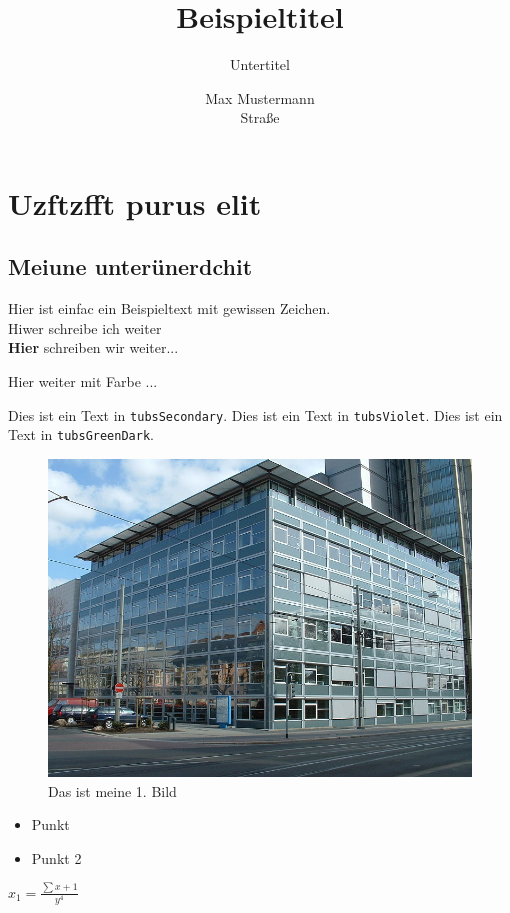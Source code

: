 \documentclass[%
  a4paper,%
  12pt,%
  blue,%
  ]{tubsartcl}
\title{Beispieltitel}
\subtitle{Untertitel}
\author{Max Mustermann\\\large{Straße}}
\begin{document}
\maketitle%

\tableofcontents
\newpage

\section{Uzftzfft purus elit}
\subsection{Meiune unterünerdchit}
Hier ist einfac ein Beispieltext mit gewissen Zeichen.\\
Hiwer schreibe ich weiter\\
\textbf{Hier} schreiben wir weiter...

\textcolor{tubsViolet}{Hier weiter mit Farbe ...}

\textcolor{tubsSecondaryLight80}{Dies ist ein Text in \texttt{tubsSecondary}.}
\textcolor{tubsViolet}{Dies ist ein Text in \texttt{tubsViolet}.}
\textcolor{tubsGreenDark}{Dies ist ein Text in \texttt{tubsGreenDark}.}\bigskip


\begin{figure}
\centering
\includegraphics[width=0.7\linewidth]{infozentrum}
\caption{Das ist meine 1. Bild}
\label{fig:infozentrum}
\end{figure}

\begin{itemize}
	\item Punkt
	\item Punkt 2
\end{itemize}

$ x_{1}  = \frac{\sum x + 1}{y^{4}} $
\end{document}
